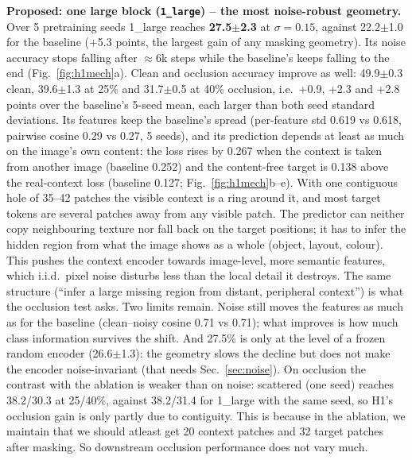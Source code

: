 \textbf{Proposed: one large block (\texttt{1\_large}) -- the most noise-robust geometry.}
\obs Over 5 pretraining seeds 1\_large reaches \textbf{27.5$\pm$2.3} at $\sigma{=}0.15$, against 22.2$\pm$1.0 for the baseline
(+5.3 points, the largest gain of any masking geometry). 
Its noise accuracy stops falling after
$\approx$6k steps while the baseline's keeps falling to the end (Fig.~\ref{fig:h1mech}a). Clean and occlusion accuracy
improve as well: 49.9$\pm$0.3 clean, 39.6$\pm$1.3 at 25\% and 31.7$\pm$0.5 at 40\% occlusion, i.e.\ +0.9, +2.3 and +2.8 points
over the baseline's 5-seed mean, each larger than both seed standard deviations. Its features keep the baseline's spread
(per-feature std 0.619 vs 0.618, pairwise cosine 0.29 vs 0.27, 5 seeds), and its prediction depends at least as much on
the image's own content: the loss rises by 0.267 when the context is taken from another image (baseline 0.252) and the
content-free target is 0.138 above the real-context loss (baseline 0.127; Fig.~\ref{fig:h1mech}b--e).
\interp With one contiguous hole of 35--42 patches the visible context is a ring around it, and most target tokens are
several patches away from any visible patch. The predictor can neither copy neighbouring texture nor fall back on the
target positions; it has to infer the hidden region from what the image shows as a whole (object, layout, colour). This
pushes the context encoder towards image-level, more semantic features, which i.i.d.\ pixel noise disturbs less than the
local detail it destroys. The same structure (``infer a large missing region from distant, peripheral context'') is what
the occlusion test asks. 
Two limits remain. Noise still moves the features as much as for the baseline (clean--noisy cosine 0.71 vs 0.71); what
improves is how much class information survives the shift. And 27.5\% is only at the level of a frozen random encoder
(26.6$\pm$1.3): the geometry slows the decline but does not make the encoder noise-invariant (that needs
Sec.~\ref{sec:noise}). On occlusion the contrast with the ablation is weaker than on noise: scattered (one seed) reaches
38.2/30.3 at 25/40\%, against 38.2/31.4 for 1\_large with the same seed, so H1's occlusion gain is only partly due to
contiguity. This is because in the ablation, we maintain that we should atleast get 20 context patches and 32 target patches 
after masking. So downstream occlusion performance does not vary much.

